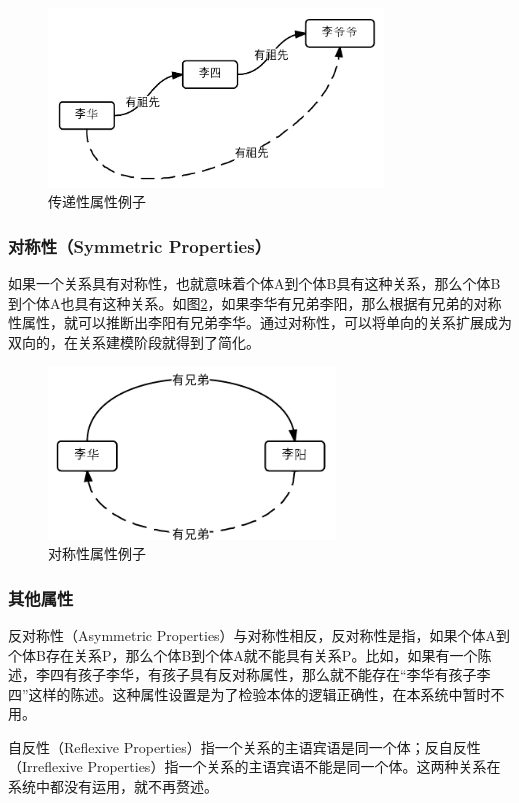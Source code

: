 \documentclass[12pt,a4paper]{article}
\begin{document}
	\begin{figure}[htbp] 
	\centering\includegraphics[width=3.5in]{fig/transitivePropertyExample.png} 
	\caption{传递性属性例子}\label{fig:传递性属性例子} 
	\end{figure}	
	
		\subsubsection{对称性（Symmetric Properties）}
	如果一个关系具有对称性，也就意味着个体A到个体B具有这种关系，那么个体B到个体A也具有这种关系。如图\ref{fig:对称性属性例子}，如果李华有兄弟李阳，那么根据有兄弟的对称性属性，就可以推断出李阳有兄弟李华。通过对称性，可以将单向的关系扩展成为双向的，在关系建模阶段就得到了简化。
	\begin{figure}[htbp] 
	\centering\includegraphics[width=3in]{fig/SymmetricPropertyExample.png} 
	\caption{对称性属性例子}\label{fig:对称性属性例子} 
	\end{figure}	
	
		\subsubsection{其他属性}
	反对称性（Asymmetric Properties）与对称性相反，反对称性是指，如果个体A到个体B存在关系P，那么个体B到个体A就不能具有关系P。比如，如果有一个陈述，李四有孩子李华，有孩子具有反对称属性，那么就不能存在“李华有孩子李四”这样的陈述。这种属性设置是为了检验本体的逻辑正确性，在本系统中暂时不用。
	
	自反性（Reflexive Properties）指一个关系的主语宾语是同一个体；反自反性（Irreflexive Properties）指一个关系的主语宾语不能是同一个体。这两种关系在系统中都没有运用，就不再赘述。
	
\end{document}
